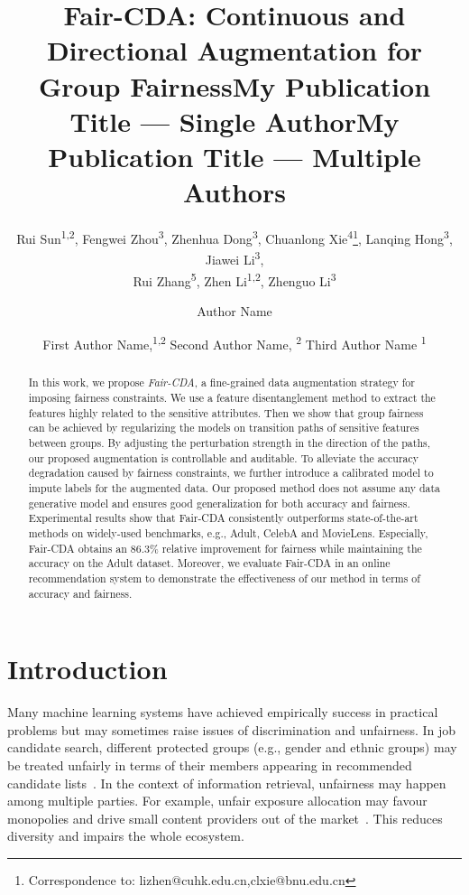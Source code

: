 \documentclass[letterpaper]{article} %
\title{Fair-CDA: Continuous and Directional Augmentation for Group Fairness}
\author{
    Rui Sun\textsuperscript{\rm 1,\rm 2}\equalcontrib, Fengwei Zhou\textsuperscript{\rm 3}\equalcontrib, Zhenhua Dong\textsuperscript{\rm 3},
    Chuanlong Xie\textsuperscript{\rm 4}\footnote{Correspondence to: lizhen@cuhk.edu.cn,clxie@bnu.edu.cn},
    Lanqing Hong\textsuperscript{\rm 3},
    Jiawei Li\textsuperscript{\rm 3}, \\
    Rui Zhang\textsuperscript{\rm 5},
    Zhen Li\textsuperscript{\rm 1,2}\footnotemark[2],
    Zhenguo Li\textsuperscript{\rm 3}
}
\title{My Publication Title --- Single Author}
\author {
    Author Name
}
\title{My Publication Title --- Multiple Authors}
\author {
    First Author Name,\textsuperscript{\rm 1,\rm 2}
    Second Author Name, \textsuperscript{\rm 2}
    Third Author Name \textsuperscript{\rm 1}
}
\begin{document}
\maketitle

\begin{abstract}
In this work, we propose {\it Fair-CDA}, a fine-grained data augmentation strategy for imposing fairness constraints. We use a feature disentanglement method to extract the features highly related to the sensitive attributes. Then we show that group fairness can be achieved by regularizing the models on transition paths of sensitive features between groups. By adjusting the perturbation strength  in the direction of the paths, our proposed augmentation is controllable and auditable. To alleviate the accuracy degradation caused by fairness constraints,  we further introduce a calibrated model to impute labels for the augmented data. Our proposed method does not assume any data generative model and ensures good generalization for both accuracy and fairness. Experimental results show that Fair-CDA consistently outperforms state-of-the-art methods on widely-used benchmarks, e.g., Adult, CelebA and MovieLens. 
Especially, Fair-CDA obtains an 86.3\% relative improvement for fairness while maintaining the accuracy on the Adult dataset.
Moreover, we evaluate Fair-CDA in an online recommendation system to demonstrate the effectiveness of our method in terms of accuracy and fairness.
\end{abstract}



\section{Introduction}

Many machine learning systems have achieved empirically success in practical problems but may sometimes raise issues of discrimination and unfairness.
In job candidate search, different protected groups (e.g., gender and ethnic groups) may be treated unfairly in terms of their members appearing in recommended candidate lists~\cite{ekstrand2021fairness}.
In the context of information retrieval, unfairness may happen among multiple parties. For example, unfair exposure allocation may favour monopolies and drive small content providers out of the market~\cite{Morik_2020}. This reduces diversity and impairs the whole ecosystem. 
\end{document}
